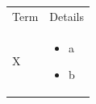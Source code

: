 \documentclass{article}
\begin{document}
\begin{table}[h]
\begin{tabular}{ll}
Term & Details \\
X & \begin{itemize}\item a\item b\end{itemize} \\
\end{tabular}
\end{table}
\end{document}
